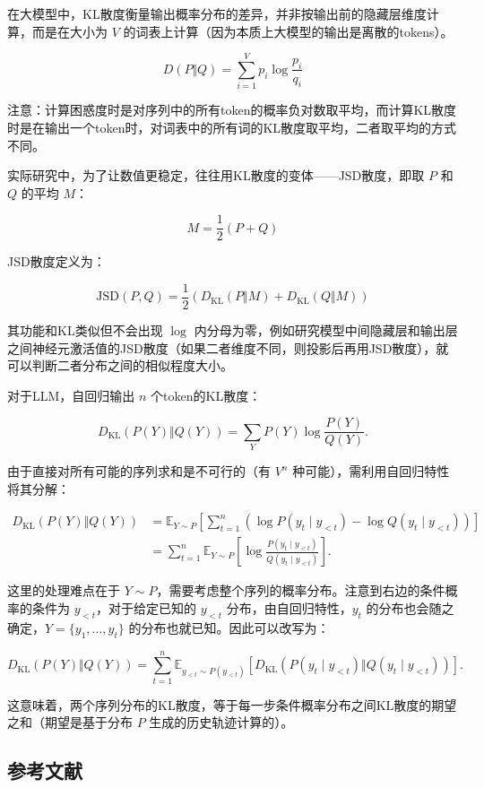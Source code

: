 在大模型中，KL散度衡量输出概率分布的差异，并非按输出前的隐藏层维度计算，而是在大小为 \(V\) 的词表上计算（因为本质上大模型的输出是离散的tokens）。

\[
D(P\Vert Q)=\sum_{i=1}^{V}p_i\log\frac{p_i}{q_i}
\]

注意：计算困惑度时是对序列中的所有token的概率负对数取平均，而计算KL散度时是在输出一个token时，对词表中的所有词的KL散度取平均，二者取平均的方式不同。

实际研究中，为了让数值更稳定，往往用KL散度的变体------JSD散度，即取 \(P\) 和 \(Q\) 的平均 \(M\)：

\[
M=\frac{1}{2}(P+Q)
\]

JSD散度定义为：

\[
\mathrm{JSD}(P,Q)=\frac{1}{2}\left(D_{\mathrm{KL}}(P\Vert M)+D_{\mathrm{KL}}(Q\Vert M)\right)
\]

其功能和KL类似但不会出现 \(\log\) 内分母为零，例如研究模型中间隐藏层和输出层之间神经元激活值的JSD散度（如果二者维度不同，则投影后再用JSD散度），就可以判断二者分布之间的相似程度大小。

对于LLM，自回归输出 \(n\) 个token的KL散度：

\[
D_{\mathrm{KL}}(P(Y)\Vert Q(Y))
=
\sum_Y P(Y)\log\frac{P(Y)}{Q(Y)}.
\]

由于直接对所有可能的序列求和是不可行的（有 \(V^n\) 种可能），需利用自回归特性将其分解：

\[
\begin{aligned}
D_{\mathrm{KL}}(P(Y)\Vert Q(Y))
&=\mathbb{E}_{Y\sim P}
\left[
\sum_{t=1}^{n}
\left(
\log P(y_t\mid y_{<t})-\log Q(y_t\mid y_{<t})
\right)
\right] \\
&=\sum_{t=1}^{n}
\mathbb{E}_{Y\sim P}
\left[
\log\frac{P(y_t\mid y_{<t})}{Q(y_t\mid y_{<t})}
\right].
\end{aligned}
\]

这里的处理难点在于 \(Y\sim P\)，需要考虑整个序列的概率分布。注意到右边的条件概率的条件为 \(y_{<t}\)，对于给定已知的 \(y_{<t}\) 分布，由自回归特性，\(y_t\) 的分布也会随之确定，\(Y=\{y_1,\ldots,y_t\}\) 的分布也就已知。因此可以改写为：

\[
D_{\mathrm{KL}}(P(Y)\Vert Q(Y))
=
\sum_{t=1}^{n}
\mathbb{E}_{y_{<t}\sim P(y_{<t})}
\left[
D_{\mathrm{KL}}\left(P(y_t\mid y_{<t})\Vert Q(y_t\mid y_{<t})\right)
\right].
\]

这意味着，两个序列分布的KL散度，等于每一步条件概率分布之间KL散度的期望之和（期望是基于分布 \(P\) 生成的历史轨迹计算的）。

\hypertarget{ux53c2ux8003ux6587ux732e-107}{%
\subsection{参考文献}\label{ux53c2ux8003ux6587ux732e-107}}

